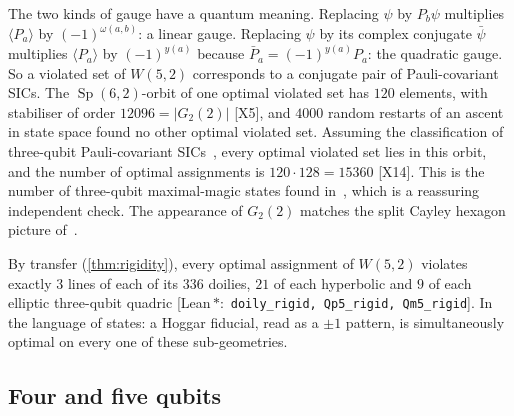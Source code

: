 \documentclass[a4paper,onecolumn,11pt,unpublished,nopdfoutputerror]{quantumarticle}
\theoremstyle{definition}
\newcommand{\leancin}[1]{{\footnotesize\color{leangreen}[\textsf{Lean}\,$\ast$:~\texttt{#1}]}}
\newcommand{\cert}[1]{\textcolor{certblue}{\textsf{[#1]}}}
\newcommand{\Sp}{\operatorname{Sp}}
\newcommand{\W}[1]{W(#1,2)}
\newcommand{\ev}[1]{\langle #1\rangle}
\begin{document}
The two kinds of gauge have a quantum meaning. Replacing $\psi$ by $P_b\psi$ multiplies $\ev{P_a}$ by
$(-1)^{\omega(a,b)}$: a linear gauge. Replacing $\psi$ by its complex conjugate $\bar\psi$ multiplies $\ev{P_a}$ by
$(-1)^{y(a)}$ because $\bar P_a=(-1)^{y(a)}P_a$: the quadratic gauge. So a violated set of $\W5$ corresponds to a
conjugate pair of Pauli-covariant SICs. The $\Sp(6,2)$-orbit of one optimal violated set has $120$ elements, with
stabiliser of order $12096=|G_2(2)|$ \cert{X5}, and $4000$ random restarts of an ascent in state space found no
other optimal violated set. Assuming the classification of three-qubit Pauli-covariant SICs~\cite{Hoggar1998,
GodsilRoy2009}, every optimal violated set lies in this orbit, and the number of optimal assignments is
$120\cdot128=15360$ \cert{X14}. This is the number of three-qubit maximal-magic states found
in~\cite{ExtremalMagic2025}, which is a reassuring independent check. The appearance of $G_2(2)$ matches the split
Cayley hexagon picture of~\cite{Saniga2023}.

By transfer (\cref{thm:rigidity}), every optimal assignment of $\W5$ violates exactly $3$ lines of each of its $336$
doilies, $21$ of each hyperbolic and $9$ of each elliptic three-qubit quadric \leancin{doily\_rigid, Qp5\_rigid,
Qm5\_rigid}. In the language of states: a Hoggar fiducial, read as a $\pm1$ pattern, is simultaneously optimal on
every one of these sub-geometries.

\subsection{Four and five qubits}
\end{document}
